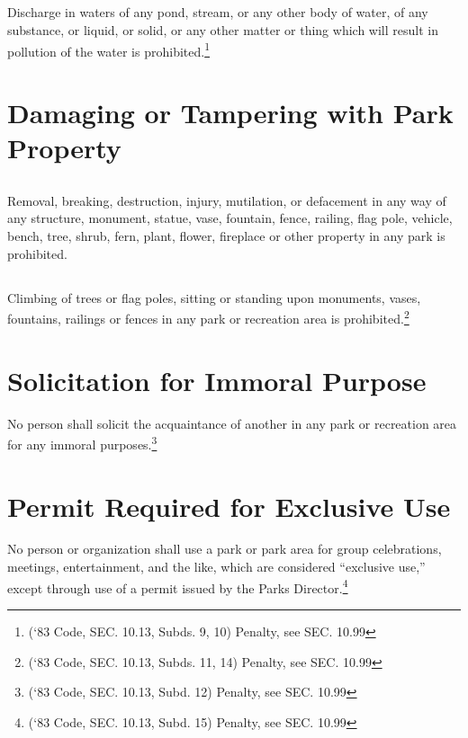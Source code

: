 \subsection{}
Discharge in waters of any pond, stream, or any other body of water, of any substance, or liquid, or solid, or any other matter or thing which will result in pollution of the water is prohibited.\footnote{(‘83 Code, SEC. 10.13, Subds. 9, 10)  Penalty, see SEC. 10.99}
\section{Damaging or Tampering with Park Property}
\subsection{}
Removal, breaking, destruction, injury, mutilation, or defacement in any way of any structure, monument, statue, vase, fountain, fence, railing, flag pole, vehicle, bench, tree, shrub, fern, plant, flower, fireplace or other property in any park is prohibited.
\subsection{}
Climbing of trees or flag poles, sitting or standing upon monuments, vases, fountains, railings or fences in any park or recreation area is prohibited.\footnote{(‘83 Code, SEC. 10.13, Subds. 11, 14)  Penalty, see SEC. 10.99}
\section{Solicitation for Immoral Purpose}
No person shall solicit the acquaintance of another in any park or recreation area for any immoral purposes.\footnote{(‘83 Code, SEC. 10.13, Subd. 12)  Penalty, see SEC. 10.99}
\section{Permit Required for Exclusive Use}
No person or organization shall use a park or park area for group celebrations, meetings, entertainment, and the like, which are considered “exclusive use,” except through use of a permit issued by the Parks Director.\footnote{(‘83 Code, SEC. 10.13, Subd. 15)  Penalty, see SEC. 10.99}
